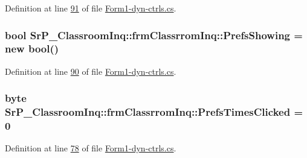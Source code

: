 \-Definition at line \hyperlink{_form1-dyn-ctrls_8cs_source_l00091}{91} of file \hyperlink{_form1-dyn-ctrls_8cs_source}{\-Form1-\/dyn-\/ctrls.\-cs}.

\hypertarget{class_sr_p___classroom_inq_1_1frm_classrrom_inq_a915bf1ba42b54c697d1d90043610385f}{
\subsubsection[{\-Prefs\-Showing}]{\setlength{\rightskip}{0pt plus 5cm}bool {\bf \-Sr\-P\-\_\-\-Classroom\-Inq\-::frm\-Classrrom\-Inq\-::\-Prefs\-Showing} = new bool()}}
\label{class_sr_p___classroom_inq_1_1frm_classrrom_inq_a915bf1ba42b54c697d1d90043610385f}


\-Definition at line \hyperlink{_form1-dyn-ctrls_8cs_source_l00090}{90} of file \hyperlink{_form1-dyn-ctrls_8cs_source}{\-Form1-\/dyn-\/ctrls.\-cs}.

\hypertarget{class_sr_p___classroom_inq_1_1frm_classrrom_inq_a649306fdbca853561ee4a6cac829315a}{
\subsubsection[{\-Prefs\-Times\-Clicked}]{\setlength{\rightskip}{0pt plus 5cm}byte {\bf \-Sr\-P\-\_\-\-Classroom\-Inq\-::frm\-Classrrom\-Inq\-::\-Prefs\-Times\-Clicked} = 0}}
\label{class_sr_p___classroom_inq_1_1frm_classrrom_inq_a649306fdbca853561ee4a6cac829315a}


\-Definition at line \hyperlink{_form1-dyn-ctrls_8cs_source_l00078}{78} of file \hyperlink{_form1-dyn-ctrls_8cs_source}{\-Form1-\/dyn-\/ctrls.\-cs}.

